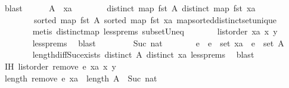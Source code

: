 \begin{isabellebody}
\ blast\isanewline
\ \ \ \ \isamarkupfalse%
\ {\isachardoublequoteopen}A\ {\isacharequal}\ xa{\isachardoublequoteclose}\isanewline
\ \ \ \ \ \ \isamarkupfalse%
\ {\isacartoucheopen}distinct\ {\isacharparenleft}map\ fst\ A{\isacharparenright}{\isacartoucheclose}\ {\isacartoucheopen}distinct\ {\isacharparenleft}map\ fst\ xa{\isacharparenright}{\isacartoucheclose}\isanewline
\ \ \ \ \ \ \ \ {\isacartoucheopen}sorted\ {\isacharparenleft}map\ fst\ A{\isacharparenright}{\isacartoucheclose}\ {\isacartoucheopen}sorted\ {\isacharparenleft}map\ fst\ xa{\isacharparenright}{\isacartoucheclose}\ map{\isacharunderscore}sorted{\isacharunderscore}distinct{\isacharunderscore}set{\isacharunderscore}unique\isanewline
\ \ \ \ \ \ \isamarkupfalse%
\ {\isacharparenleft}metis\ distinct{\isacharunderscore}map\ less{\isachardot}prems{\isacharparenleft}{}{\isacharparenright}\ subset{\isacharunderscore}Un{\isacharunderscore}eq{\isacharparenright}\isanewline
\ \ \ \ \isamarkupfalse%
\ \isamarkupfalse%
\ {\isachardoublequoteopen}list{\isacharunderscore}order\ xa\ x\ y{\isachardoublequoteclose}\ \isanewline
\ \ \ \ \ \ \isamarkupfalse%
\ less{\isachardot}prems{\isacharparenleft}{}{\isacharparenright}\ \isamarkupfalse%
\ blast\isanewline
\ \ \isamarkupfalse%
\isanewline
\ \ \ \ \isamarkupfalse%
\ {\isacharparenleft}Suc\ nat{\isacharparenright}\isanewline
\ \ \ \ \isamarkupfalse%
\ \isamarkupfalse%
\ e\ \ {\isachardoublequoteopen}e\ {\isasymin}\ set\ xa{\isachardoublequoteclose}\ \ {\isachardoublequoteopen}e\ {\isasymnotin}\ set\ A{\isachardoublequoteclose}\isanewline
\ \ \ \ \ \ \isamarkupfalse%
\ length{\isacharunderscore}diff{\isacharunderscore}Suc{\isacharunderscore}exists\ {\isacartoucheopen}distinct\ A{\isacartoucheclose}\ {\isacartoucheopen}distinct\ xa{\isacartoucheclose}\ less{\isachardot}prems{\isacharparenleft}{}{\isacharparenright}\ \isamarkupfalse%
\ blast\isanewline
\ \ \ \ \isamarkupfalse%
\ IH{\isacharcolon}\ {\isachardoublequoteopen}list{\isacharunderscore}order\ {\isacharparenleft}remove{}\ e\ xa{\isacharparenright}\ x\ y{\isachardoublequoteclose}\isanewline
\ \ \ \ \isamarkupfalse%
\ {\isacharminus}\isanewline
\ \ \ \ \ \ \isamarkupfalse%
\ {\isachardoublequoteopen}length\ {\isacharparenleft}remove{}\ e\ xa{\isacharparenright}\ {\isacharminus}\ length\ A\ {\isacharless}\ Suc\ nat{\isachardoublequoteclose}\isanewline

\end{isabellebody}

